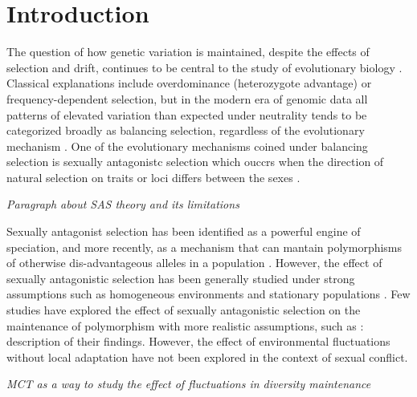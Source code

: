 \documentclass[]{article}
\begin{document}

%
\section{Introduction}

The question of how genetic variation is maintained, despite the effects of selection and drift, continues to be central to the study of evolutionary biology \citep{walsh_evolution_2018}. Classical explanations include overdominance (heterozygote advantage) or frequency-dependent selection, but in the modern era of genomic data all patterns of elevated variation than expected under neutrality tends to be categorized broadly as balancing selection, regardless of the evolutionary mechanism \citep{mitchell-olds_which_2007}.  One of the evolutionary mechanisms coined under balancing selection is sexually antagonistc selection  which ouccrs when the direction of natural selection on traits or loci differs between the sexes \citep{connallon2018environmental}.

\textit{Paragraph about SAS theory and its limitations}

Sexually antagonist selection has been identified as a powerful engine of speciation, and more recently, as a mechanism that can mantain polymorphisms of otherwise dis-advantageous alleles in a population  \citep{connallon_evolutionary_2018, gavrilets2014sexual}. However, the effect of sexually antagonistic selection has been generally studied under strong assumptions such as homogeneous environments and stationary populations \citep{}. Few studies have explored the effect of sexually antagonistic selection on the maintenance of polymorphism with more realistic assumptions, such as \citet{connallon_evolutionary_2018} : description of their findings. However, the effect of environmental fluctuations without local adaptation have not been explored in the context of sexual conflict.

\textit{MCT as a way to study the effect of fluctuations in diversity maintenance}
\end{document}

